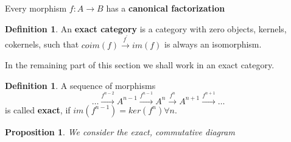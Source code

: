 \documentclass[12pt,a4paper]{article}
\newtheorem{proposition}[theorem]{Proposition}
\theoremstyle{definition}
\newtheorem{definition}[theorem]{Definition}
\theoremstyle{remark}
\begin{document}
	Every morphism $f: A \rightarrow B$ has a \textbf{canonical factorization}
	\begin{center}
	\end{center}
	\begin{definition}
		An \textbf{exact category} is a category with zero objects, kernels, cokernels, such that $coim(f) \xrightarrow{f^{'}} im(f)$ is always an isomorphism.
	\end{definition}
	In the remaining part of this section we shall work in an exact category.
	\begin{definition}
		A sequence of morphisms
		\begin{equation}
			\dots \xrightarrow{f^{n-2}} A^{n-1} \xrightarrow{f^{n-1}} A^n \xrightarrow{f^{n}}A^{n+1} \xrightarrow{f^{n+1}} \dots
		\end{equation}
		is called \textbf{exact}, if $im(f^{n-1})=ker(f^n) \forall n$. \\
	\end{definition}
	\begin{proposition}
		We consider the exact, commutative diagram
	\end{proposition}
\end{document}
